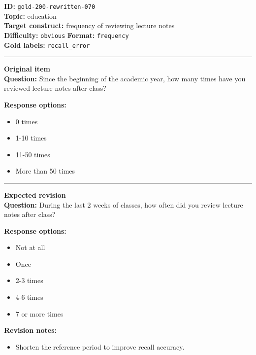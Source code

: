 \documentclass[10pt,a4paper]{article}
\newcommand{\sectionline}{\vspace{0.15em}\hrule\vspace{0.35em}}
\begin{document}
\begin{tcolorbox}[colframe=FlawRed,colback=white,colbacktitle=FlawRed!9,coltitle=black,title={Item 070\hfill Flawed item}]
\textbf{ID:} \texttt{gold-200-rewritten-070}\\
\textbf{Topic:} education\\
\textbf{Target construct:} frequency of reviewing lecture notes\\
\textbf{Difficulty:} \texttt{obvious} \quad \textbf{Format:} \texttt{frequency}\\
\textbf{Gold labels:} \texttt{recall\_error}\\
\sectionline
\textbf{Original item}\\
\textbf{Question:} Since the beginning of the academic year, how many times have you reviewed lecture notes after class?
\par\textbf{Response options:}
\begin{itemize}
\item 0 times
\item 1-10 times
\item 11-50 times
\item More than 50 times
\end{itemize}
\sectionline
\textbf{Expected revision}\\
\textbf{Question:} During the last 2 weeks of classes, how often did you review lecture notes after class?
\par\textbf{Response options:}
\begin{itemize}
\item Not at all
\item Once
\item 2-3 times
\item 4-6 times
\item 7 or more times
\end{itemize}
\par\textbf{Revision notes:}
\begin{itemize}
\item Shorten the reference period to improve recall accuracy.
\end{itemize}
\end{tcolorbox}
\end{document}
